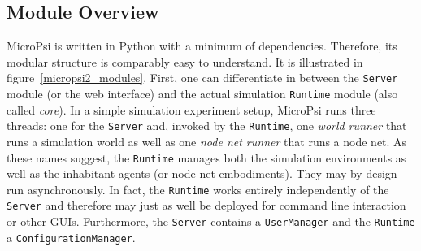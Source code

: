         \subsection{Module Overview}
    

        
MicroPsi is written in Python with a minimum of dependencies. Therefore, its  modular structure is comparably easy to understand. It is illustrated in figure~\ref{micropsi2_modules}. First, one can differentiate in between the \texttt{Server} module (or the web interface) and the actual simulation \texttt{Runtime} module (also called \emph{core}). In a simple simulation experiment setup, MicroPsi runs three threads: one for the \texttt{Server} and, invoked by the \texttt{Runtime}, one \emph{world runner} that runs a simulation world as well as one \emph{node net runner} that runs a node net. As these names suggest, the \texttt{Runtime} manages both the simulation environments as well as the inhabitant agents (or node net embodiments). They may by design run asynchronously. In fact, the \texttt{Runtime} works entirely independently of the \texttt{Server} and therefore may just as well be deployed for command line interaction or other GUIs. Furthermore, the \texttt{Server} contains a \texttt{UserManager} and the \texttt{Runtime} a \texttt{ConfigurationManager}.~\cite{conf/agi/Bach12}
\\          

          
